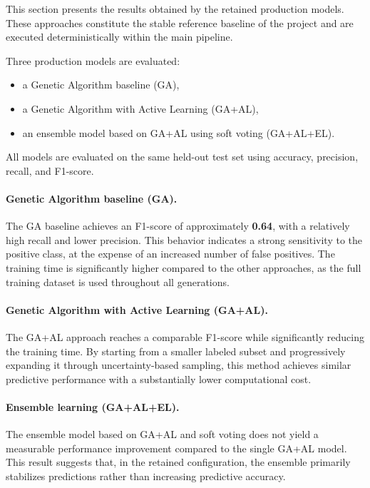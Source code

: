 \documentclass[12pt,a4paper]{article}
\begin{document}
This section presents the results obtained by the retained production models. These approaches constitute the stable reference baseline of the project and are executed deterministically within the main pipeline.

\medskip

Three production models are evaluated:
\begin{itemize}
    \item a Genetic Algorithm baseline (GA),
    \item a Genetic Algorithm with Active Learning (GA+AL),
    \item an ensemble model based on GA+AL using soft voting (GA+AL+EL).
\end{itemize}

All models are evaluated on the same held-out test set using accuracy, precision, recall, and F1-score.

\medskip

\paragraph{Genetic Algorithm baseline (GA).}
The GA baseline achieves an F1-score of approximately \textbf{0.64}, with a relatively high recall and lower precision. This behavior indicates a strong sensitivity to the positive class, at the expense of an increased number of false positives. The training time is significantly higher compared to the other approaches, as the full training dataset is used throughout all generations.

\medskip

\paragraph{Genetic Algorithm with Active Learning (GA+AL).}
The GA+AL approach reaches a comparable F1-score while significantly reducing the training time. By starting from a smaller labeled subset and progressively expanding it through uncertainty-based sampling, this method achieves similar predictive performance with a substantially lower computational cost.

\medskip

\paragraph{Ensemble learning (GA+AL+EL).}
The ensemble model based on GA+AL and soft voting does not yield a measurable performance improvement compared to the single GA+AL model. This result suggests that, in the retained configuration, the ensemble primarily stabilizes predictions rather than increasing predictive accuracy.
\end{document}
